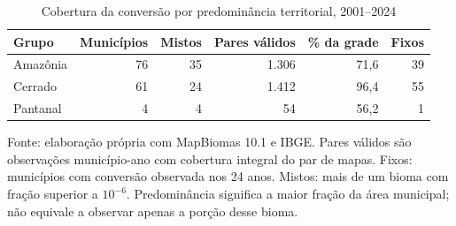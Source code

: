 \begin{table}[htbp]
\centering
\small
\caption{Cobertura da conversão por predominância territorial, 2001--2024}\label{tab:h1-cobertura}
\begin{tabular}{lrrrrr}
\hline
Grupo & Municípios & Mistos & Pares válidos & \% da grade & Fixos \\
\hline
Amazônia & 76 & 35 & 1.306 & 71,6 & 39 \\
Cerrado & 61 & 24 & 1.412 & 96,4 & 55 \\
Pantanal & 4 & 4 & 54 & 56,2 & 1 \\
\hline
\end{tabular}
\par\smallskip\begin{minipage}{\textwidth}\footnotesize
Fonte: elaboração própria com MapBiomas 10.1 e IBGE. Pares válidos são observações município-ano com cobertura integral do par de mapas. Fixos: municípios com conversão observada nos 24 anos. Mistos: mais de um bioma com fração superior a $10^{-6}$. Predominância significa a maior fração da área municipal; não equivale a observar apenas a porção desse bioma.
\end{minipage}
\end{table}
